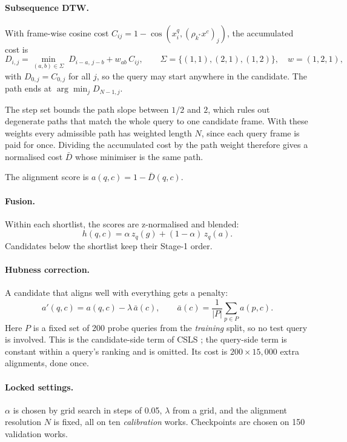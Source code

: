 \documentclass[10pt]{article}
\begin{document}
\paragraph{Subsequence DTW.} With frame-wise cosine cost $C_{ij}=1-\cos(x^q_i,(\rho_{k^*}x^c)_j)$, the accumulated cost is
\[
D_{i,j}=\min_{(a,b)\in\Sigma}\;D_{i-a,\,j-b}+w_{ab}\,C_{ij},\qquad \Sigma=\{(1,1),(2,1),(1,2)\},\quad w=(1,2,1),
\]
with $D_{0,j}=C_{0,j}$ for all $j$, so the query may start anywhere in the candidate. The path ends at $\arg\min_j D_{N-1,j}$.

The step set bounds the path slope between $1/2$ and $2$, which rules out degenerate paths that match the whole query to one candidate frame. With these weights every admissible path has weighted length $N$, since each query frame is paid for once. Dividing the accumulated cost by the path weight therefore gives a normalised cost $\bar D$ whose minimiser is the same path.

The alignment score is $a(q,c)=1-\bar D(q,c)$.

\paragraph{Fusion.} Within each shortlist, the scores are z-normalised and blended:
\[
h(q,c)=\alpha\,z_q(g)+(1-\alpha)\,z_q(a).
\]
Candidates below the shortlist keep their Stage-1 order.

\paragraph{Hubness correction.} A candidate that aligns well with everything gets a penalty:
\[
a'(q,c)=a(q,c)-\lambda\,\bar a(c),\qquad \bar a(c)=\frac{1}{|P|}\sum_{p\in P}a(p,c).
\]
Here $P$ is a fixed set of 200 probe queries from the \emph{training} split, so no test query is involved. This is the candidate-side term of CSLS \citep{csls}; the query-side term is constant within a query's ranking and is omitted. Its cost is $200\times15{,}000$ extra alignments, done once.

\paragraph{Locked settings.} $\alpha$ is chosen by grid search in steps of 0.05, $\lambda$ from a grid, and the alignment resolution $N$ is fixed, all on ten \emph{calibration} works. Checkpoints are chosen on 150 validation works.


\end{document}

